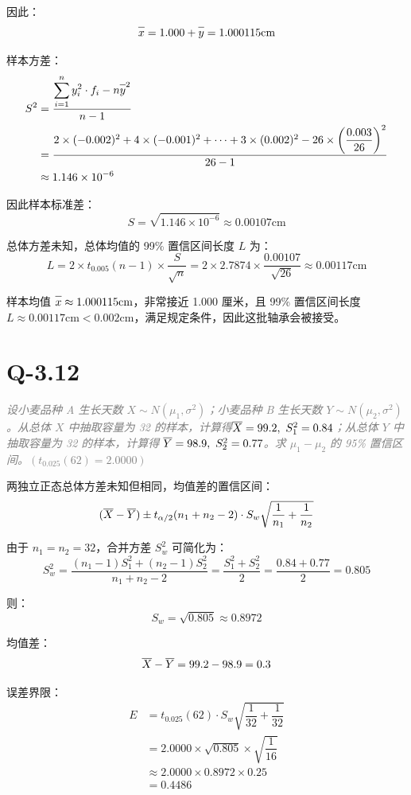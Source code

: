 \documentclass{article}
\newcommand{\barline}[1]{\overline{#1\rule{0pt}{1.5ex}}}
\begin{document}
因此：
\[ \barline{x}=1.000+\barline{y}=1.000115\text{cm} \]

样本方差：
\begin{align*}
    S^2&=\dfrac{\displaystyle\sum_{i=1}^{n}y_i^2\cdot f_i-n\barline{y}^2}{n-1}
    \\
    &=\dfrac{2\times(-0.002)^2+4\times(-0.001)^2+\cdots+3\times(0.002)^2-26\times\left(\dfrac{0.003}{26}\right)^2}{26-1}
    \\
    &\approx1.146\times10^{-6}
\end{align*}

因此样本标准差：
\[ S=\sqrt{\displaystyle1.146\times10^{-6}}\approx0.00107\text{cm} \]

总体方差未知，总体均值的 99\% 置信区间长度 $L$ 为：
\[ L=2\times t_{0.005}(n-1)\times\dfrac{S}{\displaystyle\sqrt{n}}=2\times2.7874\times\dfrac{0.00107}{\displaystyle\sqrt{26}}\approx0.00117\text{cm} \]

样本均值 $\barline{x}\approx1.000115\text{cm}$，非常接近 1.000 厘米，且 99\% 置信区间长度 $L\approx0.00117\text{cm}<0.002\text{cm}$，满足规定条件，因此这批轴承会被接受。



\section{Q-3.12}
\textit{\textcolor{gray}{设小麦品种 A 生长天数 $X\sim N(\mu_1, \sigma^2)$；小麦品种 B 生长天数 $Y\sim N(\mu_2, \sigma^2)$。从总体 $X$ 中抽取容量为 32 的样本，计算得$\barline{X}=99.2,\ S_1^2=0.84$；从总体 $Y$ 中抽取容量为 32 的样本，计算得 $\barline{Y}=98.9,\ S_2^2=0.77$。求 $\mu_1-\mu_2$ 的 95\% 置信区间。$(t_{0.025}(62) = 2.0000)$}}

两独立正态总体方差未知但相同，均值差的置信区间：
\[ (\barline{X}-\barline{Y})\pm t_{\alpha/2}(n_1+n_2-2)\cdot S_w\sqrt{\dfrac{1}{n_1}+\dfrac{1}{n_2}} \]

由于 $n_1=n_2=32$，合并方差 $S_w^2$ 可简化为：
\[ S_w^2=\dfrac{(n_1-1)S_1^2+(n_2-1)S_2^2}{n_1+n_2-2}=\dfrac{S_1^2+S_2^2}{2}=\dfrac{0.84+0.77}{2}=0.805 \]

则：
\[ S_w=\sqrt{0.805}\approx0.8972 \]

均值差：
\[ \barline{X}-\barline{Y}=99.2-98.9=0.3 \]

误差界限：
\begin{align*}
    E&=t_{0.025}(62)\cdot S_w\sqrt{\dfrac{1}{32}+\dfrac{1}{32}}
    \\
    &=2.0000\times\sqrt{0.805}\times\sqrt{\dfrac{1}{16}}
    \\
    &\approx2.0000\times0.8972\times0.25
    \\
    &=0.4486
\end{align*}
\end{document}

